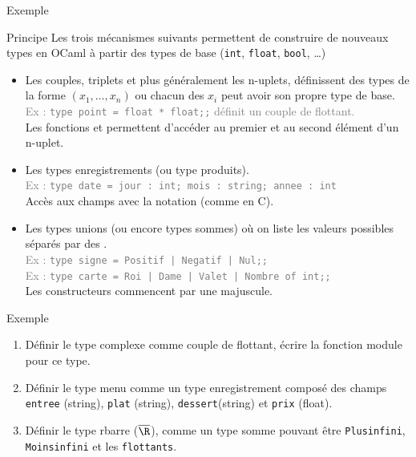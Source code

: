 \documentclass[10pt]{beamer}
\begin{document}
\begin{frame}{\Ctitle}{\stitle}
	\begin{exampleblock}{Exemple}
	\end{exampleblock}
\end{frame}

\begin{frame}{\Ctitle}{\stitle}
	\begin{block}{Principe}
		Les trois mécanismes suivants permettent de construire de nouveaux types en OCaml à partir des types de base ({\tt int}, {\tt float}, {\tt bool}, \dots)
		\begin{itemize}
			\item<2-> Les couples, triplets et plus généralement les n-uplets, définissent des types de la forme $(x_1,\dots,x_n)$ ou chacun des $x_i$ peut avoir son propre type de base. \\
				\onslide<3->\textcolor{gray}{Ex : \texttt{type point = float * float;;} définit un couple de flottant.}\\
				\onslide<4->Les fonctions  et  permettent d'accéder au premier et au second élément d'un n-uplet.
			\item<5-> Les types enregistrements (ou type produits).\\
				\onslide<6->\textcolor{gray}{Ex : \texttt{type date = {jour : int; mois : string; annee : int}}}\\
				\onslide<7-> Accès aux champs avec la notation  (comme en C).
			\item<8-> Les types unions (ou encore types sommes) où on liste les valeurs possibles séparés par des \kw{|}. \\
				\onslide<9->\textcolor{gray}{Ex : \texttt{type signe = Positif | Negatif | Nul;;}}\\
				\onslide<10->\textcolor{gray}{Ex : \texttt{type carte = Roi | Dame | Valet | Nombre of int;;}}\\
				\onslide<11->\textcolor{BrickRed}{\small \danger \;} Les constructeurs commencent par une majuscule.
		\end{itemize}
	\end{block}
\end{frame}

\begin{frame}{\Ctitle}{\stitle}
	\begin{exampleblock}{Exemple}
		\begin{enumerate}
			\item<1-> Définir le type complexe comme couple de flottant, écrire la fonction module pour ce type.
			\item<2-> Définir le type menu comme un type enregistrement composé des champs {\tt entree} (string), {\tt plat} (string), {\tt dessert}(string) et {\tt prix} (float).
			\item<3-> Définir le type rbarre ($\overline{\R}$), comme un type somme pouvant être {\tt Plusinfini}, {\tt Moinsinfini} et les {\tt flottants}.
		\end{enumerate}
	\end{exampleblock}
\end{frame}
\end{document}
